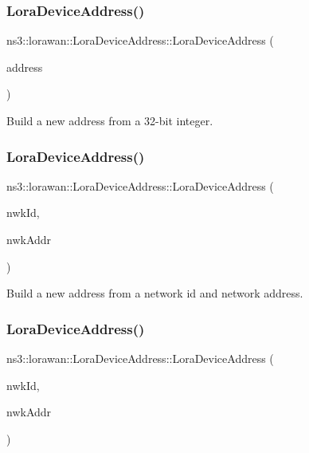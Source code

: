 \subsubsection{\texorpdfstring{Lora\+Device\+Address()}{LoraDeviceAddress()}\hspace{0.1cm}{\footnotesize\ttfamily [1/3]}}
{\footnotesize\ttfamily ns3\+::lorawan\+::\+Lora\+Device\+Address\+::\+Lora\+Device\+Address (\begin{DoxyParamCaption}\item[{uint32\+\_\+t}]{address }\end{DoxyParamCaption})}

Build a new address from a 32-\/bit integer. \mbox{\label{classns3_1_1lorawan_1_1LoraDeviceAddress_a8b0f78dd742fae5198def4127a77db36}} 
\subsubsection{\texorpdfstring{Lora\+Device\+Address()}{LoraDeviceAddress()}\hspace{0.1cm}{\footnotesize\ttfamily [2/3]}}
{\footnotesize\ttfamily ns3\+::lorawan\+::\+Lora\+Device\+Address\+::\+Lora\+Device\+Address (\begin{DoxyParamCaption}\item[{uint8\+\_\+t}]{nwk\+Id,  }\item[{uint32\+\_\+t}]{nwk\+Addr }\end{DoxyParamCaption})}

Build a new address from a network id and network address. \mbox{\label{classns3_1_1lorawan_1_1LoraDeviceAddress_a67abdaddf3a98dd9c63d09216bd85314}} 
\subsubsection{\texorpdfstring{Lora\+Device\+Address()}{LoraDeviceAddress()}\hspace{0.1cm}{\footnotesize\ttfamily [3/3]}}
{\footnotesize\ttfamily ns3\+::lorawan\+::\+Lora\+Device\+Address\+::\+Lora\+Device\+Address (\begin{DoxyParamCaption}\item[{\hyperlink{classns3_1_1lorawan_1_1NwkID}{Nwk\+ID}}]{nwk\+Id,  }\item[{\hyperlink{classns3_1_1lorawan_1_1NwkAddr}{Nwk\+Addr}}]{nwk\+Addr }\end{DoxyParamCaption})}

